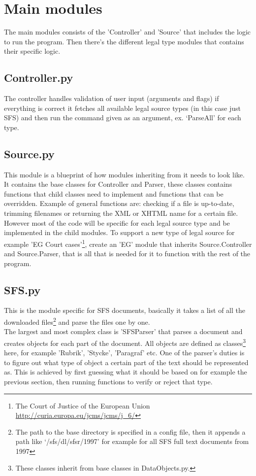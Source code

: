 \section{Main modules}

The main modules consists of the 'Controller' and 'Source' that includes the logic to run the program. Then there's the different legal type modules that contains their specific logic.  

\subsection{Controller.py}
The controller handles validation of user input (arguments and flags) if everything is correct it fetches all available legal source types (in this case just SFS) and then run the command given as an argument, ex. ‘ParseAll’ for each type.

\subsection{Source.py}
This module is a blueprint of how modules inheriting from it needs to look like. It contains the base classes for Controller and Parser, these classes contains functions that child classes need to implement and functions that can be overridden. Example of general functions are: checking if a file is up-to-date, trimming filenames or returning the XML or XHTML name for a certain file.\\
However most of the code will be specific for each legal source type and be implemented in the child modules. To support a new type of legal source for example 'EG Court cases'\footnote{The Court of Justice of the European Union \url{http://curia.europa.eu/jcms/jcms/j_6/}}, create an 'EG' module that inherits Source.Controller and Source.Parser, that is all that is needed for it to function with the rest of the program.

\subsection{SFS.py}
This is the module specific for SFS documents, basically it takes a list of all the downloaded files\footnote{The path to the base directory is specified in a config file, then it appends a path like ‘/sfs/dl/sfsr/1997’ for example for all SFS full text documents from 1997} and parse the files one by one.\\
The largest and most complex class is 'SFSParser' that parses a document and creates objects for each part of the document. All objects are defined as classes\footnote{These classes inherit from base classes in DataObjects.py.} here, for example 'Rubrik', 'Stycke', 'Paragraf' etc. One of the parser's duties is to figure out what type of object a certain part of the text should be represented as. This is achieved by first guessing what it should be based on for example the previous section, then running functions to verify or reject that type.


